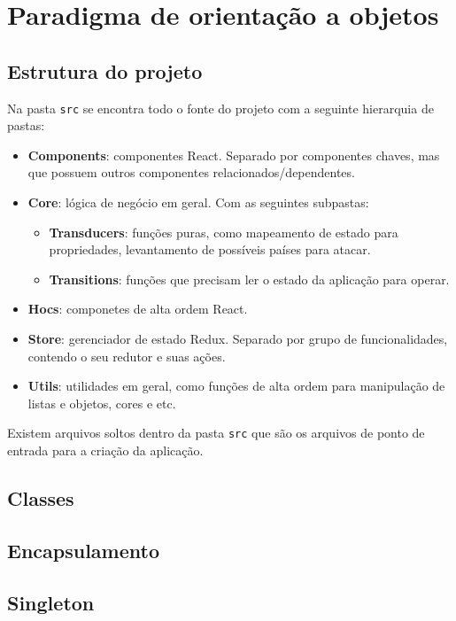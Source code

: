 \documentclass[rel_mlp]{iiufrgs}
\begin{document}
\section{Paradigma de orientação a objetos}

\subsection{Estrutura do projeto}
Na pasta \verb|src| se encontra todo o fonte do projeto com a seguinte hierarquia de pastas:
\begin{itemize}
  \item \textbf{Components}: componentes React. Separado por componentes chaves, mas que possuem outros componentes relacionados/dependentes.
  \item \textbf{Core}: lógica de negócio em geral. Com as seguintes subpastas:
    \begin{itemize}
      \item \textbf{Transducers}: funções puras, como mapeamento de estado para propriedades, levantamento de possíveis países para atacar.
      \item \textbf{Transitions}: funções que precisam ler o estado da aplicação para operar.
    \end{itemize}
  \item \textbf{Hocs}: componetes de alta ordem React.
  \item \textbf{Store}: gerenciador de estado Redux. Separado por grupo de funcionalidades, contendo o seu redutor e suas ações.
  \item \textbf{Utils}: utilidades em geral, como funções de alta ordem para manipulação de listas e objetos, cores e etc.
\end{itemize}

\par Existem arquivos soltos dentro da pasta \verb|src| que são os arquivos de ponto de entrada para a criação da aplicação.

\subsection{Classes}

\subsection{Encapsulamento}

\subsection{Singleton}
\end{document}
